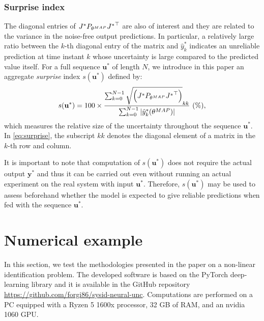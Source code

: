 \documentclass{ifacconf}
\newcommand{\nsamp}{N}
\newcommand{\MAP}{{\rm MAP}}
\newcommand{\tvec}[1]{{\mathbf{#1}}}
\newcommand{\mean}[1]{\hat{#1}}
\begin{document}
\subsubsection{Surprise index}
The diagonal entries of $J^* P_{\theta^{\MAP}} {J^*}^\top$ are also of interest and they are related to the variance in the noise-free output predictions. In particular, a relatively large ratio between the $k$-th diagonal entry of the matrix and $\mean{{y}}^*_{k}$ indicates an unreliable prediction at time instant $k$ whose uncertainty is large compared to the predicted value itself. 
For a full sequence $\tvec{u}^*$ of length $\nsamp$, we introduce in this paper an aggregate \emph{surprise} index $s(\tvec{u}^*)$ defined by:
\begin{equation}
\label{eq:surprise}
s(\tvec{u}^*) =  100 \times \frac{\sum_{k=0}^{\nsamp-1} \sqrt{\left (J^* P_{\theta^{\MAP}} {J^*}^\top \right )}_{kk}}{\sum_{k=0}^{\nsamp-1} |\mean{y}_k^{*}(\theta^{\MAP})|}~(\%),
\end{equation}
which measures the relative size of the uncertainty throughout the sequence $\tvec{u}^*$. In \eqref{eq:surprise}, the subscript  $kk$ denotes the diagonal element of a matrix in the $k$-th row and column.   

It is important to note that computation of $s(\tvec{u}^*)$ does not require the actual output $\tvec{y}^*$ and thus it can be carried out even without running an actual experiment on the real system with input $\tvec{u}^*$.
Therefore, $s(\tvec{u}^*)$ may be used to assess beforehand whether the model is expected to give reliable predictions when fed with the sequence $\tvec{u}^*$.



\section{Numerical example}
In this section, we test the methodologies presented in the paper on a non-linear identification problem. %
The developed software is based on the PyTorch deep-learning library and it is available in the GitHub repository \url{https://github.com/forgi86/sysid-neural-unc}.
Computations are performed on a PC equipped with a Ryzen 5 1600x processor, 32 GB of RAM, and an nvidia 1060 GPU.
\end{document}

